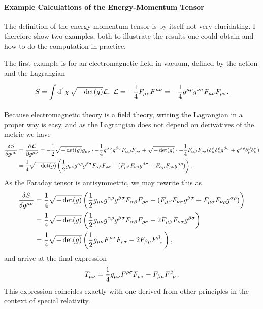 \paragraph{Example Calculations of the Energy-Momentum Tensor}
The definition of the energy-momentum tensor is by itself not very elucidating. I therefore show two examples, both to illustrate the results one could obtain and how to do the computation in practice.

The first example is for an electromagnetic field in vacuum, defined by the action and the Lagrangian
\begin{align*}
	S = \int\limits_{}^{}\dd[4]{\chi}\sqrt{-\det(g)}\mathcal{L},\ \mathcal{L} = -\frac{1}{4}F_{\mu\nu}F^{\mu\nu} = -\frac{1}{4}g^{\mu\rho}g^{\nu\sigma}F_{\mu\nu}F_{\rho\sigma}.
\end{align*}
Because electromagnetic theory is a field theory, writing the Lagrangian in a proper way is easy, and as the Lagrangian does not depend on derivatives of the metric we have
\begin{align*}
	\fdv{S}{g^{\mu\nu}} &= \pdv{\lag}{g^{\mu\nu}} = -\frac{1}{2}\sqrt{-\det(g)}g_{\mu\nu}\cdot -\frac{1}{4}g^{\alpha\sigma}g^{\beta\sigma}F_{\alpha\beta}F_{\rho\sigma} + \sqrt{-\det(g)}\cdot -\frac{1}{4}F_{\alpha\beta}F_{\rho\sigma}(\kdelta{\alpha}{\mu}\kdelta{\rho}{\nu}g^{\beta\sigma} + g^{\alpha\rho}\kdelta{\beta}{\mu}\kdelta{\sigma}{\nu}) \\
	                    &= \frac{1}{4}\sqrt{-\det(g)}\left(\frac{1}{2}g_{\mu\nu}g^{\alpha\rho}g^{\beta\sigma}F_{\alpha\beta}F_{\rho\sigma} - (F_{\mu\beta}F_{\nu\sigma}g^{\beta\sigma} + F_{\alpha\mu}F_{\rho\nu}g^{\alpha\rho})\right).
\end{align*}
As the Faraday tensor is antisymmetric, we may rewrite this as
\begin{align*}
	\fdv{S}{g^{\mu\nu}} &= \frac{1}{4}\sqrt{-\det(g)}\left(\frac{1}{2}g_{\mu\nu}g^{\alpha\rho}g^{\beta\sigma}F_{\alpha\beta}F_{\rho\sigma} - (F_{\mu\beta}F_{\nu\sigma}g^{\beta\sigma} + F_{\mu\alpha}F_{\nu\rho}g^{\alpha\rho})\right) \\
	                    &= \frac{1}{4}\sqrt{-\det(g)}\left(\frac{1}{2}g_{\mu\nu}g^{\alpha\rho}g^{\beta\sigma}F_{\alpha\beta}F_{\rho\sigma} - 2F_{\mu\beta}F_{\nu\sigma}g^{\beta\sigma}\right) \\
	                    &= \frac{1}{4}\sqrt{-\det(g)}\left(\frac{1}{2}g_{\mu\nu}F^{\rho\sigma}F_{\rho\sigma} - 2F_{\beta\mu}\tensor{F}{^{\beta}_{\nu}}\right),
\end{align*}
and arrive at the final expression
\begin{align*}
	T_{\mu\nu} = \frac{1}{4}g_{\mu\nu}F^{\rho\sigma}F_{\rho\sigma} - F_{\beta\mu}\tensor{F}{^{\beta}_{\nu}}.
\end{align*}
This expression coincides exactly with one derived from other principles in the context of special relativity.

